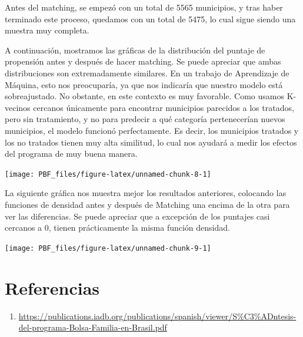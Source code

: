 \documentclass[
]{article}
\providecommand{\tightlist}{%
  \setlength{\itemsep}{0pt}\setlength{\parskip}{0pt}}
\begin{document}
Antes del matching, se empezó con un total de 5565 municipios, y tras
haber terminado este proceso, quedamos con un total de 5475, lo cual
sigue siendo una muestra muy completa.

A continuación, mostramos las gráficas de la distribución del puntaje de
propensión antes y después de hacer matching. Se puede apreciar que
ambas distribuciones son extremadamente similares. En un trabajo de
Aprendizaje de Máquina, esto nos preocuparía, ya que nos indicaría que
nuestro modelo está sobreajustado. No obstante, en este contexto es muy
favorable. Como usamos K-vecinos cercanos únicamente para encontrar
municipios parecidos a los tratados, pero sin tratamiento, y no para
predecir a qué categoría pertenecerían nuevos municipios, el modelo
funcionó perfectamente. Es decir, los municipios tratados y los no
tratados tienen muy alta similitud, lo cual nos ayudará a medir los
efectos del programa de muy buena manera.

\begin{center}\texttt{[image: PBF\_files/figure-latex/unnamed-chunk-8-1]} \end{center}

La siguiente gráfica nos muestra mejor los resultados anteriores,
colocando las funciones de densidad antes y después de Matching una
encima de la otra para ver las diferencias. Se puede apreciar que a
excepción de los puntajes casi cercanos a 0, tienen prácticamente la
misma función densidad.

\begin{center}\texttt{[image: PBF\_files/figure-latex/unnamed-chunk-9-1]} \end{center}
\newpage

\newpage

\hypertarget{referencias}{%
\section{Referencias}\label{referencias}}

\begin{enumerate}
\def\labelenumi{\arabic{enumi}.}
\tightlist
\item
  \url{https://publications.iadb.org/publications/spanish/viewer/S\%C3\%ADntesis-del-programa-Bolsa-Familia-en-Brasil.pdf}
\end{enumerate}
\end{document}
